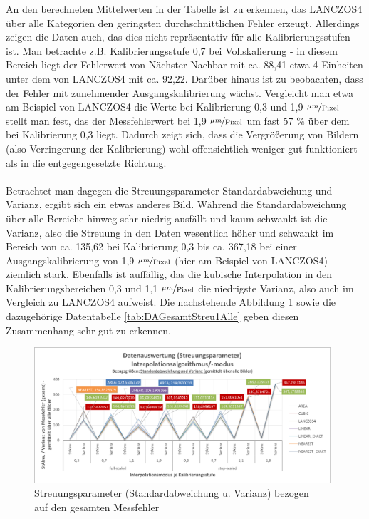\documentclass[
fontsize=10pt, 
listof = totoc,
parskip = half	
]{report}
\begin{document}
\noindent An den berechneten Mittelwerten in der Tabelle ist zu erkennen, das LANCZOS4 über alle Kategorien den geringsten durchschnittlichen Fehler erzeugt. Allerdings zeigen die Daten auch, das dies nicht repräsentativ für alle Kalibrierungsstufen ist. Man betrachte z.B. Kalibrierungsstufe 0,7 bei Vollskalierung - in diesem Bereich liegt der Fehlerwert von Nächster-Nachbar mit ca. 88,41 etwa 4 Einheiten unter dem von LANCZOS4 mit ca. 92,22. Darüber hinaus ist zu beobachten, dass der Fehler mit zunehmender Ausgangskalibrierung wächst. Vergleicht man etwa am Beispiel von LANCZOS4 die Werte bei Kalibrierung  0,3  und 1,9 $\nicefrac{\mu m}{\text{Pixel}}$ stellt man fest, das der Messfehlerwert bei 1,9 $\nicefrac{\mu m}{\text{Pixel}}$ um fast 57 $\%$ über dem bei Kalibrierung 0,3 liegt. Dadurch zeigt sich, dass die Vergrößerung von Bildern (also Verringerung der Kalibrierung) wohl offensichtlich weniger gut funktioniert als in die entgegengesetzte Richtung.
\\\\
Betrachtet man dagegen die Streuungsparameter Standardabweichung und Varianz, ergibt sich ein etwas anderes Bild. Während die Standardabweichung über alle Bereiche hinweg sehr niedrig ausfällt und kaum schwankt ist die Varianz, also die Streuung in den Daten wesentlich höher und schwankt im Bereich von ca. 135,62 bei Kalibrierung 0,3 bis ca. 367,18 bei einer Ausgangskalibrierung von 1,9 $\nicefrac{\mu m}{\text{Pixel}}$ (hier am Beispiel von LANCZOS4) ziemlich stark. Ebenfalls ist auffällig, das die kubische Interpolation in den Kalibrierungsbereichen 0,3 und 1,1 $\nicefrac{\mu m}{\text{Pixel}}$ die niedrigste Varianz, also auch im Vergleich zu LANCZOS4 aufweist.  Die nachstehende Abbildung \ref{fig:DAGesamtStreu1Alle} sowie die dazugehörige Datentabelle \ref{tab:DAGesamtStreu1Alle} geben diesen Zusammenhang sehr gut zu erkennen.

\begin{figure}[H]
	\centering
	\includegraphics[width=11cm, height=\textheight, keepaspectratio]{pics/DA_Gesamt_Streu1_Alle}
	\caption{Streuungsparameter (Standardabweichung u. Varianz) bezogen\\ auf den gesamten Messfehler}
	\label{fig:DAGesamtStreu1Alle}
\end{figure}
	
\end{document}
